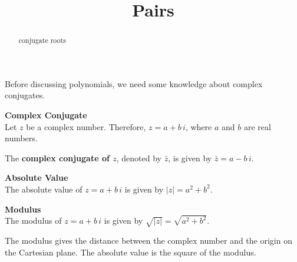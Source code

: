 \documentclass{ximera}
\title{Pairs}
\begin{document}
\begin{abstract}
conjugate roots
\end{abstract}
\maketitle







Before discussing polynomials, we need some knowledge about complex conjugates.




\begin{definition} \textbf{\textcolor{green!50!black}{Complex Conjugate}} \\

Let $z$ be a complex number.  Therefore, $z = a + b \, i$, where $a$ and $b$ are real numbers.



The \textbf{complex conjugate of $z$}, denoted by $\bar{z}$, is given by $\bar{z} = a - b \, i$.



\end{definition}








\begin{definition}   \textbf{\textcolor{green!50!black}{Absolute Value}} \\

The absolute value of $z = a + b \, i$ is given by $|z| = a^2 + b^2$. 


\end{definition}









\begin{definition}   \textbf{\textcolor{green!50!black}{Modulus}} \\

The modulus of $z = a + b \, i$ is given by $\sqrt{|z|} = \sqrt{a^2 + b^2}$. 


\end{definition}

The modulus gives the distance between the complex number and the origin on the Cartesian plane.   The absolute value is the square of the modulus.\\
\end{document}

